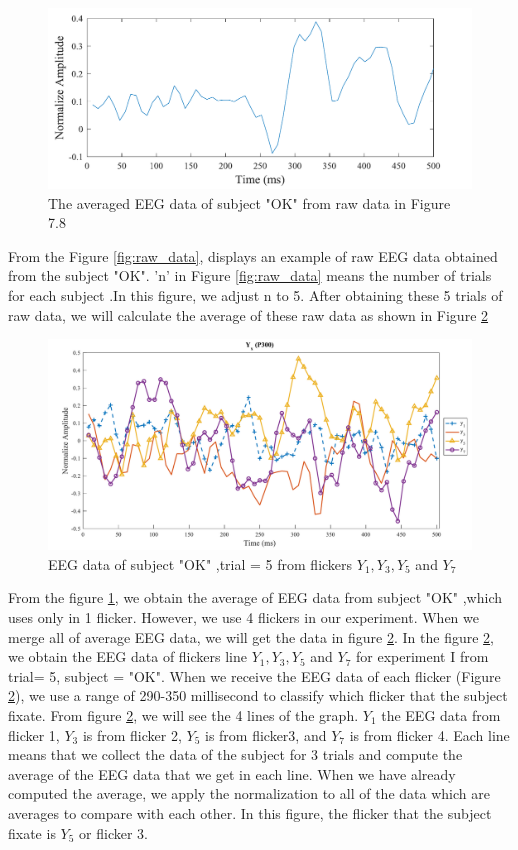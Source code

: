 \begin{figure}[ht]
	\centering
	\includegraphics[scale = 0.4]{chapter7/rawavg.pdf}
	\caption{The averaged EEG data of subject "OK" from raw data in Figure 7.8 }
		\label{fig:avg}
\end{figure}

From the Figure \ref{fig:raw_data}, displays an example of raw EEG data obtained from the  subject "OK". 'n' in Figure \ref{fig:raw_data} means the number of trials for each subject .In this figure, we adjust n to 5. After obtaining these 5 trials of raw data, we will calculate the average of these raw data as shown in Figure \ref{fig:yx}


\begin{figure}[ht]
	\centering
	\includegraphics[width=\textwidth]{chapter7/erp_result.pdf}
	\caption{EEG data of subject "OK" ,trial = 5 from flickers $Y_1,Y_3,Y_5$ and $Y_7$ }
		\label{fig:yx}
\end{figure}

From the figure \ref{fig:avg}, we obtain the average of EEG data from subject "OK" ,which uses only in 1 flicker. However, we use 4 flickers in our experiment. When we merge all of average EEG data, we will get the data in figure \ref{fig:yx}. In the figure \ref{fig:yx}, we obtain the EEG data of flickers line $Y_1,Y_3,Y_5$ and $Y_7$ for experiment I from trial= 5, subject = "OK". When we receive the EEG data of each flicker (Figure \ref{fig:yx}), we use a range of 290-350 millisecond to classify which flicker that the subject fixate. From figure \ref{fig:yx}, we will see the 4 lines of the graph. $Y_1$ the EEG data from flicker 1, $Y_3$ is from flicker 2, $Y_5$ is from flicker3, and $Y_7$ is from flicker 4. Each line means that we collect the data of the subject for 3 trials and compute the average of the EEG data that we get in each line. When we have already computed the average, we apply the normalization to all of the data which are averages to compare with each other. In this figure, the flicker that the subject fixate is $Y_5$ or flicker 3.

